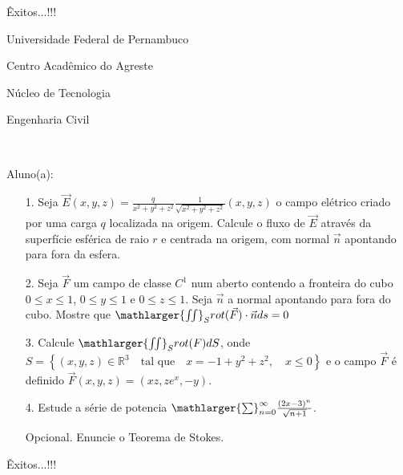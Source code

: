 \documentclass[oneside,a4paper,12pt]{article}
\newcommand{\universidade}{Universidade Federal de Pernambuco}
\newcommand{\centro}{Centro Acadêmico do Agreste}
\newcommand{\departamento}{Núcleo de Tecnologia}
\newcommand{\curso}{Engenharia Civil}
\begin{document}
	\flushbottom
	\flushright
     Êxitos...!!!
     \begin{center}
     	\vspace{50pt}
     	
     	\universidade
     	\par
     	\centro
     	\par
     	\departamento
     	\par
     	\curso
     	\par
     	\vspace{08pt}
     	\\
     \end{center}
     
     \begin{flushleft}
     	Aluno(a):
     \end{flushleft}
 
 \begin{itemize}
 	\item[1.] Seja $\vec{E}(x,y,z)=\frac{q}{x^{2}+y^{2}+z^{2}}\frac{1}{\sqrt{x^{2}+y^{2}+z^{2}}}(x,y,z)$ o campo elétrico criado por uma carga $q$ localizada na origem. Calcule o fluxo de $\vec{E}$ através da superfície esférica de raio $r$ e centrada na origem, com normal $\vec{n}$ apontando para fora da esfera.
 \end{itemize}
 \begin{itemize}
 	\item[2.]  Seja $\vec{F}$ um campo de classe $C^{1}$ num aberto contendo a fronteira do cubo $0\leq x \leq 1$, $0\leq y \leq1$ e $0\leq z \leq1$. Seja $\vec{n}$ a normal apontando para fora do cubo. Mostre que $\mathlarger{\iint}_{S}rot(\vec{F})\cdot \vec{n}ds=0$ 
 \end{itemize}
 \begin{itemize}
 	\item [3.] Calcule $\mathlarger{\iint}_{S}rot(F)dS$, onde $S=\left\lbrace  (x,y,z)\in \mathbb{R}^{3}\quad \text{tal que}\quad x=-1+y^{2}+z^{2},\quad x\leq 0 \right\rbrace $ e o campo $\vec{F}$ é definido $\vec{F}(x,y,z)=(xz,ze^{x},-y)$.
 \end{itemize}
 \begin{itemize}
 	\item[4.] Estude a série de potencia  $\mathlarger{\sum}_{n=0}^{\infty}\frac{(2x-3)^{n}}{\sqrt{n+1}}$. 
 \end{itemize}
 \begin{itemize}
 	\item[Opcional.] Enuncie o Teorema de Stokes.
 \end{itemize}
\flushbottom
\flushright
Êxitos...!!!
\end{document}
